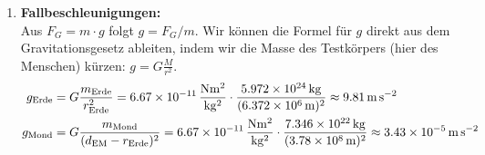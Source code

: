 \documentclass[ngerman]{scrreprt}
\newenvironment{loesungbox}[1]
  {\needspace{5\baselineskip}\begin{loesungboxstyle}[frametitle={#1}]}
  {\end{loesungboxstyle}}
\begin{document}
\begin{loesungbox}{Lösung zu \Cref{aufg:gravitation}}
\begin{enumerate}
    \item \textbf{Fallbeschleunigungen:} \\
    Aus $F_G = m \cdot g$ folgt $g = F_G/m$. Wir können die Formel für $g$ direkt aus dem Gravitationsgesetz ableiten, indem wir die Masse des Testkörpers (hier des Menschen) kürzen: $g = G \frac{M}{r^2}$. 
    \begin{align}
        g_{\text{Erde}} &= G \frac{m_{\text{Erde}}}{r_{\text{Erde}}^2} = \SI{6.67e-11}{\frac{\newton\meter^2}{\kilo\gram^2}} \cdot \frac{\SI{5.972e24}{\kilo\gram}}{(\SI{6.372e6}{\meter})^2} \approx \SI{9.81}{\meter\per\second\squared} \\ 
        g_{\text{Mond}} &= G \frac{m_{\text{Mond}}}{(d_{\text{EM}} - r_{\text{Erde}})^2} = \SI{6.67e-11}{\frac{\newton\meter^2}{\kilo\gram^2}} \cdot \frac{\SI{7.346e22}{\kilo\gram}}{(\SI{3.78e8}{\meter})^2} \approx \SI{3.43e-5}{\meter\per\second\squared} 
    \end{align}
\end{enumerate}
\end{loesungbox}
\end{document}
